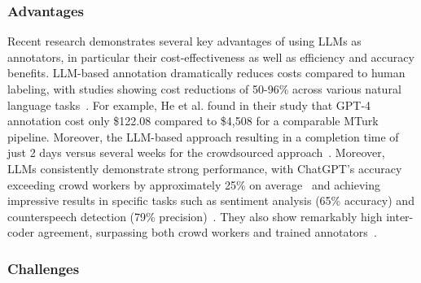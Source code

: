 \subsubsection{Advantages}

Recent research demonstrates several key advantages of using LLMs as annotators, in particular their cost-effectiveness as well as efficiency and accuracy benefits.
LLM-based annotation dramatically reduces costs compared to human labeling, with studies showing cost reductions of 50-96\% across various natural language tasks~\cite{DBLP:conf/emnlp/WangLXZZ21}.
For example, He et al. found in their study that GPT-4 annotation cost only \$122.08 compared to \$4,508 for a comparable MTurk pipeline.
Moreover, the LLM-based approach resulting in a completion time of just 2 days versus several weeks for the crowdsourced approach~\cite{DBLP:conf/chi/HeHDRH24}.
Moreover, LLMs consistently demonstrate strong performance, with ChatGPT's accuracy exceeding crowd workers by approximately 25\% on average~\cite{DBLP:journals/corr/abs-2303-15056} and achieving impressive results in specific tasks such as sentiment analysis (65\% accuracy) and counterspeech detection (79\% precision)~\cite{DBLP:journals/corr/abs-2304-10145}. They also show remarkably high inter-coder agreement, surpassing both crowd workers and trained annotators~\cite{DBLP:journals/corr/abs-2303-15056}.

\subsubsection{Challenges}

